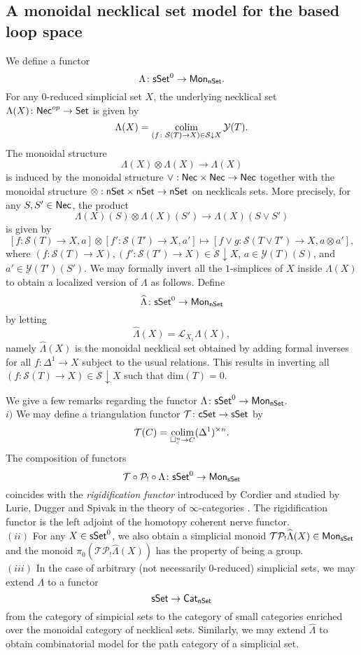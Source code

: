 \subsection{A monoidal necklical set model for the based loop space}
We define a functor 
$$\Lambda \colon \mathsf{sSet}^0 \to \mathsf{Mon}_{\mathsf{nSet}}.$$
For any $0$-reduced simplicial set $X$, the underlying necklical set $\Lambda(X) \colon \mathsf{Nec}^{op} \to \mathsf{Set}$ is given by
$$\Lambda(X) = \operatorname*{colim}_{(f \colon \mathcal{S}(T) \to X) \in  \mathcal{S} \downarrow X} \mathcal{Y}(T).$$
The monoidal structure $$\Lambda(X) \otimes \Lambda(X) \to \Lambda(X)$$
is induced by the monoidal structure $\vee: \mathsf{Nec} \times \mathsf{Nec} \to \mathsf{Nec}$ together with the monoidal structure $\otimes: \mathsf{nSet} \times \mathsf{nSet} \to \mathsf{nSet}$ on necklicals sets. More precisely, for any $S, S' \in \mathsf{Nec}$, the product $$\Lambda(X)(S) \otimes \Lambda(X)(S') \to \Lambda(X)(S \vee S')$$ is given by $$[f\colon \mathcal{S}(T) \to X, a] \otimes [f'\colon \mathcal{S}(T') \to X, a'] \mapsto [f \vee g\colon \mathcal{S}(T\vee T') \to X, a \otimes  a'],$$
where $(f\colon \mathcal{S}(T) \to X), (f'\colon \mathcal{S}(T') \to X) \in \mathcal{S} \downarrow X$, $a\in \mathcal{Y}(T)(S)$, and $a'\in \mathcal{Y}(T')(S')$.
We may formally invert all the $1$-simplices of $X$ inside $\Lambda(X)$ to obtain a localized version of $\Lambda$ as follows. Define 
$$\widehat{\Lambda} \colon \mathsf{sSet}^0 \to \mathsf{Mon}_{\mathsf{nSet}}$$
by letting
$$\widehat{\Lambda}(X)= \mathcal{L}_{X_1}\Lambda(X),$$
namely $\widehat{\Lambda}(X)$ is the monoidal necklical set obtained by adding formal inverses for all $f\colon \Delta^1 \to X$ subject to the usual relations. This results in inverting all $(f: \mathcal{S}(T) \to X) \in \mathcal{S} \downarrow X$ such that $\text{dim}(T)=0.$

\begin{remark}
We give a few remarks regarding the functor $\Lambda \colon \mathsf{sSet}^0 \to \mathsf{Mon}_{\mathsf{nSet}}$.
\\
$i)$ We may define a triangulation functor $\mathcal{T} \colon \mathsf{cSet} \to \mathsf{sSet}$ by $$\mathcal{T}(C) = \operatorname*{colim}_{\square^n_c \to C} (\Delta^1)^{\times n}.$$
The composition of functors
$$\mathcal{T} \circ \mathcal{P}_! \circ  \Lambda\colon \mathsf{sSet}^0 \to \mathsf{Mon}_{\mathsf{sSet}}$$ coincides with the \textit{rigidification functor} introduced by Cordier and studied by Lurie, Dugger and Spivak in the theory of $\infty$-categories \cite{Rivera-Zeinalian}. The rigidification functor is the left adjoint of the homotopy coherent nerve functor. 
\\
$(ii)$ For any $X \in \mathsf{sSet}^0$, we also obtain a simplicial monoid $\mathcal{T}\mathcal{P}_! \widehat{\Lambda}(X) \in \mathsf{Mon}_{\mathsf{sSet}}$ and the monoid $\pi_0( \mathcal{T}\mathcal{P}_! \widehat{\Lambda}(X))$ has the property of being a group.
\\
$(iii)$ In the case of arbitrary (not necessarily $0$-reduced) simplicial sets, we may extend  $\Lambda$ to a functor
$$\mathsf{sSet} \to \mathsf{Cat}_{\mathsf{nSet}}$$ from the category of simpicial sets to the category of small categories enriched over the monoidal category of necklical sets. Similarly, we may extend $\widehat{\Lambda}$ to obtain combinatorial model for the path category of a simplicial set.
\end{remark}

